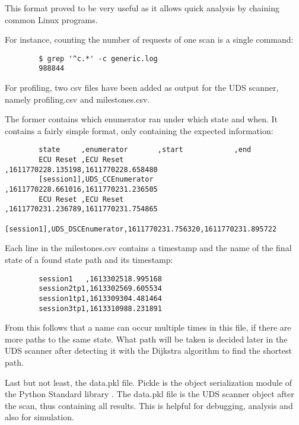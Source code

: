 This format proved to be very useful as it allows quick analysis by chaining common Linux programs.

For instance, counting the number of requests of one scan is a single command:
\begin{samepage}
    \begin{verbatim}
        $ grep '^c.*' -c generic.log
        988844
    \end{verbatim}
\end{samepage}

For profiling, two csv files have been added as output for the UDS scanner, namely profiling.csv and milestones.csv.

The former contains which enumerator ran under which state and when. It contains a fairly simple format, only containing the expected information:

\begin{samepage}
    \begin{verbatim}
        state     ,enumerator       ,start            ,end
        ECU Reset ,ECU Reset        ,1611770228.135198,1611770228.658480
        [session1],UDS_CCEnumerator ,1611770228.661016,1611770231.236505
        ECU Reset ,ECU Reset        ,1611770231.236789,1611770231.754865
        [session1],UDS_DSCEnumerator,1611770231.756320,1611770231.895722
    \end{verbatim}
\end{samepage}

Each line in the milestones.csv contains a timestamp and the name of the final state of a found state path and its timestamp:

\begin{samepage}
    \begin{verbatim}
        session1   ,1613302518.995168
        session2tp1,1613302569.605534
        session1tp1,1613309304.481464
        session3tp1,1613310988.231891
    \end{verbatim}
\end{samepage}

From this follows that a name can occur multiple times in this file, if there are more paths to the same state. What path will be taken is decided later in the UDS scanner after detecting it with the Dijkstra algorithm to find the shortest path.

Last but not least, the data.pkl file. Pickle is the object serialization module of the Python Standard library \cite{pickle}. The data.pkl file is the UDS scanner object after the scan, thus containing all results. This is helpful for debugging, analysis and also for simulation.

